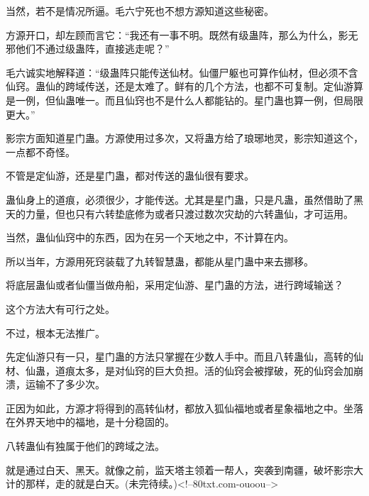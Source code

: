 \begin{this_body}
当然，若不是情况所逼。毛六宁死也不想方源知道这些秘密。

方源开口，却左顾而言它：“我还有一事不明。既然有级蛊阵，那么为什么，影无邪他们不通过级蛊阵，直接逃走呢？”

毛六诚实地解释道：“级蛊阵只能传送仙材。仙僵尸躯也可算作仙材，但必须不含仙窍。蛊仙的跨域传送，还是太难了。鲜有的几个方法，也都不可复制。定仙游算是一例，但仙蛊唯一。而且仙窍也不是什么人都能钻的。星门蛊也算一例，但局限更大。”

影宗方面知道星门蛊。方源使用过多次，又将蛊方给了琅琊地灵，影宗知道这个，一点都不奇怪。

不管是定仙游，还是星门蛊，都对传送的蛊仙很有要求。

蛊仙身上的道痕，必须很少，才能传送。尤其是星门蛊，只是凡蛊，虽然借助了黑天的力量，但也只有六转垫底修为或者只渡过数次灾劫的六转蛊仙，才可运用。

当然，蛊仙仙窍中的东西，因为在另一个天地之中，不计算在内。

所以当年，方源用死窍装载了九转智慧蛊，都能从星门蛊中来去挪移。

将底层蛊仙或者仙僵当做舟船，采用定仙游、星门蛊的方法，进行跨域输送？

这个方法大有可行之处。

不过，根本无法推广。

先定仙游只有一只，星门蛊的方法只掌握在少数人手中。而且八转蛊仙，高转的仙材、仙蛊，道痕太多，是对仙窍的巨大负担。活的仙窍会被撑破，死的仙窍会加崩溃，运输不了多少次。

正因为如此，方源才将得到的高转仙材，都放入狐仙福地或者星象福地之中。坐落在外界天地中的福地，是十分稳固的。

八转蛊仙有独属于他们的跨域之法。

就是通过白天、黑天。就像之前，监天塔主领着一帮人，突袭到南疆，破坏影宗大计的那样，走的就是白天。(未完待续。)<!--80txt.com-ouoou-->

\end{this_body}

